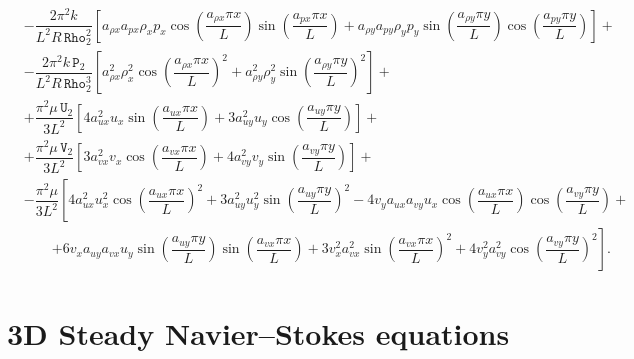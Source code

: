 \documentclass[10pt]{article}
\newcommand{\Rho}{\,\mathtt{Rho}}
\newcommand{\PP}{\,\mathtt{P}}
\newcommand{\U}{\,\mathtt{U}}
\newcommand{\V}{\,\mathtt{V}}
\begin{document}
\begin{equation}
\begin{split}
&-\dfrac{ 2 \pi^2 k }{L^2 R \Rho_2^2}\left[a_{\rho x} a_{px} \rho_x p_x \cos\left(\dfrac{a_{\rho x} \pi x}{L}\right) \sin\left(\dfrac{a_{px} \pi x}{L}\right)+a_{\rho y} a_{py} \rho_y p_y \sin\left(\dfrac{a_{\rho y} \pi y}{L}\right) \cos\left(\dfrac{a_{py} \pi y}{L}\right)\right]+\\
&- \dfrac{2\pi^2 k \PP_2 }{L^2 R \Rho_2^3}\left[a_{\rho x}^2 \rho_x^2 \cos\left(\dfrac{a_{\rho x} \pi x}{L}\right)^2+a_{\rho y}^2 \rho_y^2 \sin\left(\dfrac{a_{\rho y} \pi y}{L}\right)^2\right] +\\
&+\dfrac{\pi^2 \mu \U_2 }{3L^2} \left[4 a_{ux}^2 u_x \sin\left(\dfrac{a_{ux} \pi x}{L}\right)+3a_{uy}^2 u_y \cos\left(\dfrac{a_{uy} \pi y}{L}\right) \right] +\\
&+\dfrac{\pi^2 \mu \V_2 }{3L^2} \left[3 a_{vx}^2 v_x \cos\left(\dfrac{a_{vx} \pi x}{L}\right)+4a_{vy}^2 v_y \sin\left(\dfrac{a_{vy} \pi y}{L}\right) \right] +\\
&- \dfrac{\pi^2 \mu }{3L^2}\left[4 a_{ux}^2 u_x^2 \cos\left(\dfrac{a_{ux} \pi x}{L}\right)^2+3 a_{uy}^2 u_y^2 \sin\left(\dfrac{a_{uy} \pi y}{L}\right)^2-4 v_y a_{ux} a_{vy} u_x \cos\left(\dfrac{a_{ux} \pi x}{L}\right) \cos\left(\dfrac{a_{vy} \pi y}{L}\right)\right.+\\
    &\qquad\left.+6 v_x a_{uy} a_{vx} u_y \sin\left(\dfrac{a_{uy} \pi y}{L}\right) \sin\left(\dfrac{a_{vx} \pi x}{L}\right)+3 v_x^2 a_{vx}^2 \sin\left(\dfrac{a_{vx} \pi x}{L}\right)^2+4 v_y^2 a_{vy}^2 \cos\left(\dfrac{a_{vy} \pi y}{L}\right)^2\right].
 \end{split}
\end{equation}



\section{3D Steady Navier--Stokes equations}
\end{document}
